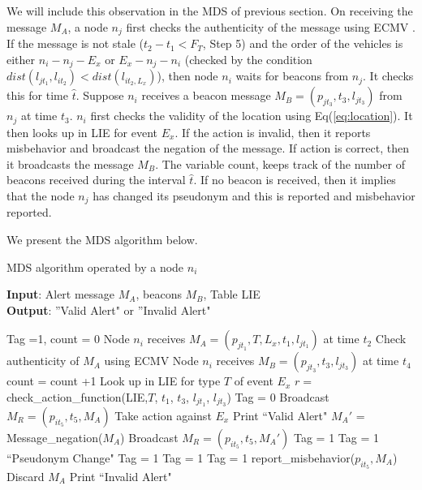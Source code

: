 \documentclass[conference]{IEEEtran}[10pt]
\begin{document}
We will include this observation in the MDS of previous section. 
On receiving the message $M_A$, a node $n_j$ first checks the authenticity of the message using ECMV \cite{WJS08}. 
If the message is not stale ($t_2-t_1 <F_T$, Step 5) and the order of the vehicles is either $n_i-n_j-E_x$ or $E_x-n_j-n_i$ (checked by the condition 
$dist(l_{jt_1},l_{it_2})< dist(l_{{it_2},L_x})$), then node $n_i$ waits for beacons  from $n_j$. 
It checks this for time $\hat{t}$. 
Suppose  $n_i$ receives a beacon message $M_B = (p_{jt_3}, t_3,l_{jt_3})$ from $n_j$ at time $t_3$. 
$n_i$ first checks the validity of the location using Eq(\ref{eq:location}). 
It then looks up in LIE for event $E_x$. 
If the action is invalid, then it reports misbehavior and broadcast the negation of the message. 
If action is correct, then it broadcasts the message $M_B$. 
The variable count, keeps track of the number of beacons received during the interval $\hat{t}$. 
If no beacon is received, then it implies that the node $n_j$ has changed its pseudonym and this is reported and misbehavior reported. 



We present the MDS algorithm below. 

\begin{algorithm}
\caption{MDS algorithm operated by a node $n_i$ }
\label{algo:MDS}
\textbf{Input}: Alert message $M_A$, beacons $M_B$, Table LIE\\
\textbf{Output}: ''Valid Alert" or ''Invalid Alert"
\begin{algorithmic}[1]
\STATE Tag =1, count = 0 
\STATE  Node $n_i$ receives  $M_A = (p_{jt_1}, T, L_x, t_1, l_{jt_1})$ at time $t_2$
\STATE Check authenticity of $M_A$ using ECMV
\STATE  Node $n_i$ receives  $M_B = (p_{jt_3}, t_3, l_{jt_3})$ at time $t_4$
\STATE  count = count +1
\STATE Look up in LIE for type $T$ of event $E_x$
\STATE $r = $ check\_action\_function(LIE,$T$, $t_1$, $t_3$, $l_{jt_1}$, $l_{jt_3}$)
\STATE Tag = 0
\STATE Broadcast $M_R = (p_{it_5}, t_5, M_A)$
\STATE Take action against $E_x$
\STATE Print ``Valid Alert"
\ELSE 
\STATE $M_A'$ = Message\_negation($M_A$) 
\STATE Broadcast $M_R = (p_{it_5}, t_5, M_A')$
\STATE Tag = 1
\ENDIF
\ELSE 
\STATE Tag = 1
\ENDIF
\ENDWHILE
\ENDWHILE
{}
\STATE ``Pseudonym Change"
\STATE Tag = 1
\ENDIF
\ELSE 
\STATE Tag = 1
\ENDIF
\ELSE 
\STATE Tag = 1
\ENDIF
{}
\STATE report\_misbehavior($p_{it_5},M_A$) 
\STATE Discard $M_A$
\STATE Print ``Invalid Alert"
\ENDIF
\end{algorithmic}
\end{algorithm}
\end{document}
